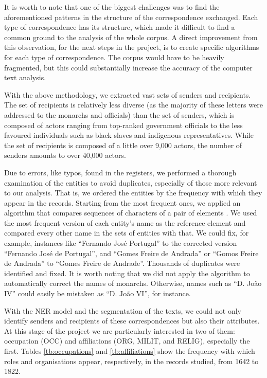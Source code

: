 \documentclass{article}
\begin{document}
It is worth to note that one of the biggest challenges was to find the aforementioned patterns in the structure of the correspondence exchanged. Each type of correspondence has its structure, which made it difficult to find a common ground to the analysis of the whole corpus. A direct improvement from this observation, for the next steps in the project, is to create specific algorithms for each type of correspondence. The corpus would have to be heavily fragmented, but this could substantially increase the accuracy of the computer text analysis.

With the above methodology, we extracted vast sets of senders and recipients. The set of recipients is relatively less diverse (as the majority of these letters were addressed to the monarchs and officials) than the set of senders, which is composed of actors ranging from top-ranked government officials to the less favoured individuals such as black slaves and indigenous representatives. While the set of recipients is composed of a little over 9,000 actors, the number of senders amounts to over 40,000 actors.

Due to errors, like typos, found in the registers, we performed a thorough examination of the entities to avoid duplicates, especially of those more relevant to our analysis. That is, we ordered the entities by the frequency with which they appear in the records. Starting from the most frequent ones, we applied an algorithm that compares sequences of characters of a pair of elements \cite{ratcliff_pattern-matching-gestalt_1988}. We used the most frequent version of each entity's name as the reference element and compared every other name in the sets of entities with that. We could fix, for example, instances like ``Fernando José Portugal'' to the corrected version ``Fernando José de Portugal'', and ``Gomes Freire de Andrada'' or ``Gomos Freire de Andrada'' to ``Gomes Freire de Andrade''. Thousands of duplicates were identified and fixed. It is worth noting that we did not apply the algorithm to automatically correct the names of monarchs. Otherwise, names such as ``D. João IV'' could easily be mistaken as ``D. João VI'', for instance.

With the NER model and the segmentation of the texts, we could not only identify senders and recipients of these correspondences but also their attributes. At this stage of the project we are particularly interested in two of them: occupation (OCC) and affiliations (ORG, MILIT, and RELIG), especially the first. Tables \ref{tb:occupations} and \ref{tb:affiliations} show the frequency with which roles and organisations appear, respectively, in the records studied, from 1642 to 1822.
\end{document}
